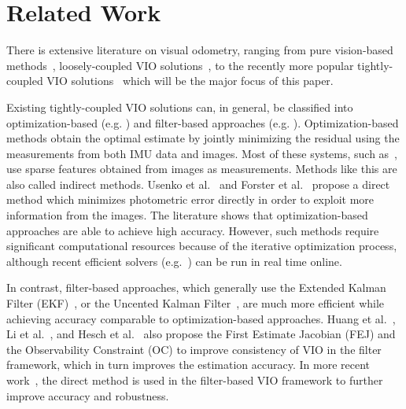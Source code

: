 \section{Related Work}
\label{sec: related work}
There is extensive literature on visual odometry, ranging from pure vision-based methods~\cite{forster2014svo, Geiger2011IV, mur2017orb, engel2017direct, engel2014lsd}, loosely-coupled VIO solutions~\cite{weiss2012real, shen2014multi}, to the recently more popular tightly-coupled VIO solutions~\cite{leutenegger2015keyframe, yang2017monocular, usenko2016direct, forster2015imu, mourikis2007multi, wu2015square, bloesch2015robust, kelly2011visual, tsotsos2015robust} which will be the major focus of this paper. 

Existing tightly-coupled VIO solutions can, in general, be classified into optimization-based (e.g. \cite{leutenegger2015keyframe, yang2017monocular, usenko2016direct}) and filter-based approaches (e.g. \cite{mourikis2007multi, tsotsos2015robust, bloesch2015robust}). Optimization-based methods obtain the optimal estimate by jointly minimizing the residual using the measurements from both IMU data and images. Most of these systems, such as~\cite{yang2017monocular}, use sparse features obtained from images as measurements. Methods like this are also called indirect methods. Usenko et al.~\cite{usenko2016direct} and Forster et al.~\cite{forster2015imu} propose a direct method which minimizes photometric error directly in order to exploit more information from the images. The literature shows that optimization-based approaches are able to achieve high accuracy. However, such methods require significant computational resources because of the iterative optimization process, although recent efficient solvers (e.g.~\cite{kaess2012isam2, ceres-solver}) can be run in real time online.

 In contrast, filter-based approaches, which generally use the Extended Kalman Filter (EKF)~\cite{mourikis2007multi}, or the Uncented Kalman Filter~\cite{kelly2011visual}, are much more efficient while achieving accuracy comparable to optimization-based approaches. Huang et al.~\cite{huang2010observability}, Li et al.~\cite{li2013high}, and Hesch et al.~\cite{hesch2014consistency}  also propose the First Estimate Jacobian (FEJ) and the Observability Constraint (OC) to improve consistency of VIO in the filter framework, which in turn improves the estimation accuracy. In  more recent work~\cite{bloesch2015robust, xing2017photometric}, the direct method is used in the filter-based VIO framework to further improve accuracy and robustness.

